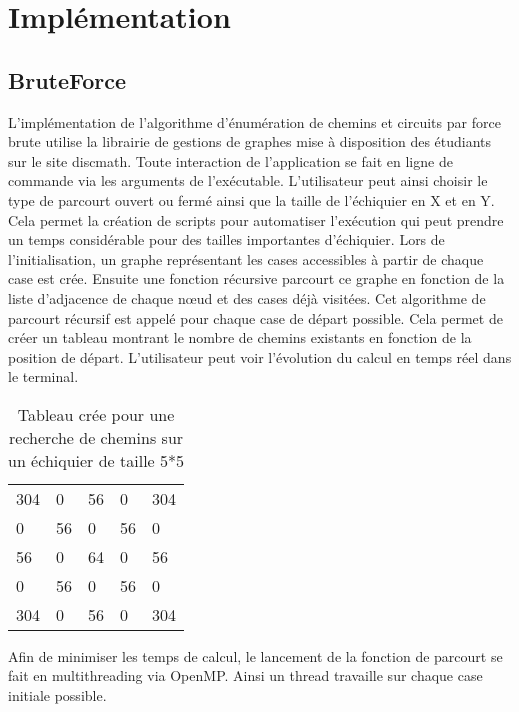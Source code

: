 \section{Implémentation}
\subsection{BruteForce}
L'implémentation de l’algorithme d’énumération de chemins et circuits par force brute utilise la librairie de gestions de graphes mise à disposition des étudiants sur le site discmath. Toute interaction de l’application se fait en ligne de commande via les arguments de l’exécutable. L’utilisateur peut ainsi choisir le type de parcourt ouvert ou fermé ainsi que la taille de l’échiquier en X et en Y.  Cela permet la création de scripts pour automatiser l’exécution qui peut prendre un temps considérable pour des tailles importantes d’échiquier.
Lors de l’initialisation, un graphe représentant les cases accessibles à partir de chaque case est crée. Ensuite une fonction récursive parcourt ce graphe en fonction de la liste d’adjacence de chaque nœud et des cases déjà visitées.
Cet algorithme de parcourt récursif est appelé pour chaque case de départ possible. Cela permet de créer un tableau montrant le nombre de chemins existants en fonction de la position de départ. L’utilisateur peut voir l’évolution du calcul en temps réel dans le terminal.
\begin{table}[H]
\centering
\caption{Tableau crée pour une recherche de chemins sur un échiquier de taille 5*5}
\label{my-label}
\begin{tabular}{lllll}
304 & 0  & 56 & 0  & 304 \\
0   & 56 & 0  & 56 & 0   \\
56  & 0  & 64 & 0  & 56  \\
0   & 56 & 0  & 56 & 0   \\
304 & 0  & 56 & 0  & 304
\end{tabular}
\end{table}

Afin de minimiser les temps de calcul, le lancement de la fonction de parcourt se fait en multithreading via OpenMP. Ainsi un thread travaille sur chaque case initiale possible.
